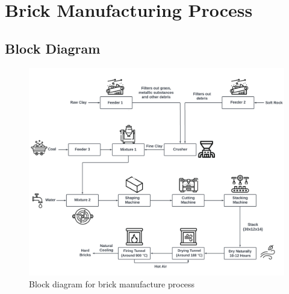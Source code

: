 \section{Brick Manufacturing Process}

\subsection{Block Diagram}
\begin{figure}[h]
  \centering
  \includegraphics[width=1\textwidth]{img/block diagram.png}
  \caption{Block diagram for brick manufacture process}
\end{figure}

